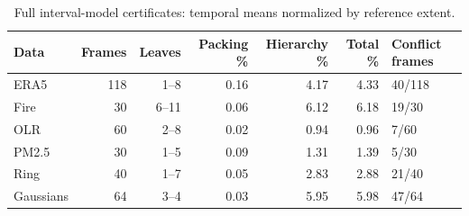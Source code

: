 \begin{table}[H]
\caption{Full interval-model certificates: temporal means normalized by reference extent.}\label{tab:cert}
\centering\footnotesize
\setlength{\tabcolsep}{3pt}
\begin{tabular}{lrrrrrl}\toprule
Data & Frames & Leaves & Packing \% & Hierarchy \% & Total \% & Conflict frames\\\midrule
ERA5 & 118 & 1--8 & 0.16 & 4.17 & 4.33 & 40/118\\
Fire & 30 & 6--11 & 0.06 & 6.12 & 6.18 & 19/30\\
OLR & 60 & 2--8 & 0.02 & 0.94 & 0.96 & 7/60\\
PM2.5 & 30 & 1--5 & 0.09 & 1.31 & 1.39 & 5/30\\
Ring & 40 & 1--7 & 0.05 & 2.83 & 2.88 & 21/40\\
Gaussians & 64 & 3--4 & 0.03 & 5.95 & 5.98 & 47/64\\
\bottomrule\end{tabular}
\par{}
\end{table}
